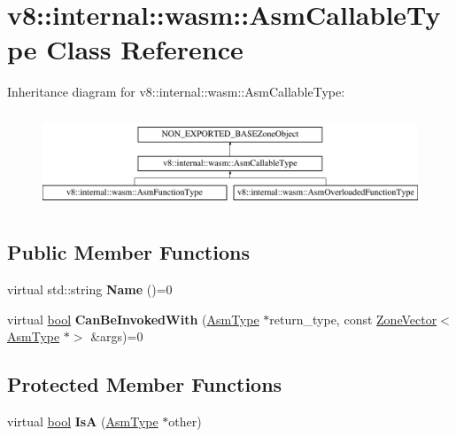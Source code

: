 \hypertarget{classv8_1_1internal_1_1wasm_1_1AsmCallableType}{}\section{v8\+:\+:internal\+:\+:wasm\+:\+:Asm\+Callable\+Type Class Reference}
\label{classv8_1_1internal_1_1wasm_1_1AsmCallableType}
Inheritance diagram for v8\+:\+:internal\+:\+:wasm\+:\+:Asm\+Callable\+Type\+:\begin{figure}[H]
\begin{center}
\leavevmode
\includegraphics[height=2.866894cm]{classv8_1_1internal_1_1wasm_1_1AsmCallableType}
\end{center}
\end{figure}
\subsection*{Public Member Functions}
\begin{DoxyCompactItemize}
\item 
\mbox{\label{classv8_1_1internal_1_1wasm_1_1AsmCallableType_a87c1a0b6d06f685a71e88d95d11b36af}} 
virtual std\+::string {\bfseries Name} ()=0
\item 
\mbox{\label{classv8_1_1internal_1_1wasm_1_1AsmCallableType_aa9b0a549b84a153a84f821a8c8fb6f2b}} 
virtual \mbox{\hyperlink{classbool}{bool}} {\bfseries Can\+Be\+Invoked\+With} (\mbox{\hyperlink{classv8_1_1internal_1_1wasm_1_1AsmType}{Asm\+Type}} $\ast$return\+\_\+type, const \mbox{\hyperlink{classv8_1_1internal_1_1ZoneVector}{Zone\+Vector}}$<$ \mbox{\hyperlink{classv8_1_1internal_1_1wasm_1_1AsmType}{Asm\+Type}} $\ast$$>$ \&args)=0
\end{DoxyCompactItemize}
\subsection*{Protected Member Functions}
\begin{DoxyCompactItemize}
\item 
\mbox{\label{classv8_1_1internal_1_1wasm_1_1AsmCallableType_ab741ddfc3cbd6fcb2b3713d2f17d4765}} 
virtual \mbox{\hyperlink{classbool}{bool}} {\bfseries IsA} (\mbox{\hyperlink{classv8_1_1internal_1_1wasm_1_1AsmType}{Asm\+Type}} $\ast$other)
\end{DoxyCompactItemize}
